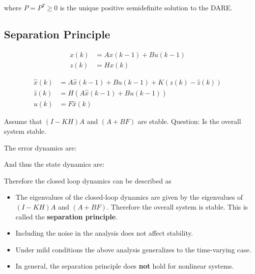 \documentclass[10pt,a4paper]{scrartcl}
\begin{document}
\begin{multicols*}{2}
\begin{multicols*}{3}
\begin{itemize}
where $P=P^T\geq 0$ is the unique positive semidefinite solution to the DARE.

\end{itemize}

\subsection{Separation Principle}

\begin{align*}
x(k)&=Ax(k-1)+Bu(k-1)\\
z(k)&=Hx(k)
\end{align*}

\begin{align*}
\hat{x}(k)&=A\hat{x}(k-1)+Bu(k-1)+K(z(k)-\hat{z}(k))\\
\hat{z}(k)&=H(A\hat{x}(k-1)+Bu(k-1))\\
u(k)&=F\hat{x}(k)
\end{align*}

Assume that $(I-KH)A$ and $(A+BF)$ are stable. Question: Is the overall system stable. 

The error dynamics are:


And thus the state dynamics are: 


Therefore the closed loop dynamics can be described as


\begin{itemize}
\item The eigenvalues of the closed-loop dynamics are given by the eigenvalues of $(I-KH)A$ and $(A+BF)$. Therefore the overall system is stable. This is called the \textbf{separation principle}.
\item Including the noise in the analysis does not affect stability.
\item Under mild conditions the above analysis generalizes to the time-varying case.
\item In general, the separation principle does \textbf{not} hold for nonlinear systems.
\end{itemize}


\end{multicols*}
\end{multicols*}
\end{document}
